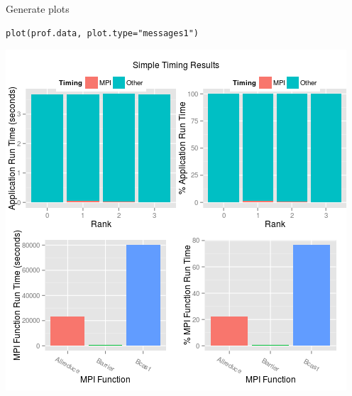 \begin{frame}[fragile]
  \begin{block}{Generate plots}
  \begin{center}\vspace{-.6cm}
\begin{lstlisting}
plot(prof.data, plot.type="messages1")
\end{lstlisting}\vspace{-.2cm}
\includegraphics[scale=.39]{../common/pics/prof/timing.png}
\end{center}
  \end{block}
\end{frame}
